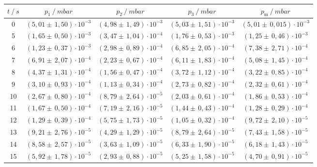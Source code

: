 \begin{table}[H]
  \centering
  \begin{tabular}{c|c|c|c|c}
    {$t \:/\: \si{s}$} & {$p_1 \:/\: \si{mbar} $} & {$p_2 \:/\: \si{mbar} $} & {$p_3 \:/\: \si{mbar} $} & {$p_{\text{m}} \:/\: \si{mbar}$}\\
  \midrule
  0    & $(5,01 \pm \, 1,50)\cdot 10^{-3}$ & $(4,98 \pm \, 1,49)\cdot 10^{-3}$ & $(5,03 \pm \, 1,51)\cdot 10^{-3}$ & $(5,01 \pm \, 0,015)\cdot 10^{-3}$\\
  5    & $(1,65 \pm \, 0,50)\cdot 10^{-3}$ & $(3,47 \pm \, 1,04)\cdot 10^{-4}$ & $(1,76 \pm \, 0,53)\cdot 10^{-3}$ & $(1,25 \pm \, 0,46)\cdot 10^{-3}$\\
  6    & $(1,23 \pm \, 0,37)\cdot 10^{-3}$ & $(2,98 \pm \, 0,89)\cdot 10^{-4}$ & $(6,85 \pm \, 2,05)\cdot 10^{-4}$ & $(7,38 \pm \, 2,71)\cdot 10^{-4}$\\  
  7    & $(6,91 \pm \, 2,07)\cdot 10^{-4}$ & $(2,23 \pm \, 0,67)\cdot 10^{-4}$ & $(6,11 \pm \, 1,83)\cdot 10^{-4}$ & $(5,08 \pm \, 1,45)\cdot 10^{-4}$\\
  8    & $(4,37 \pm \, 1,31)\cdot 10^{-4}$ & $(1,56 \pm \, 0,47)\cdot 10^{-4}$ & $(3,72 \pm \, 1,12)\cdot 10^{-4}$ & $(3,22 \pm \, 0,85)\cdot 10^{-4}$\\
  9    & $(3,10 \pm \, 0,93)\cdot 10^{-4}$ & $(1,13 \pm \, 0,34)\cdot 10^{-4}$ & $(2,73 \pm \, 0,82)\cdot 10^{-4}$ & $(2,32 \pm \, 0,61)\cdot 10^{-4}$\\
  10   & $(2,67 \pm \, 0,80)\cdot 10^{-4}$ & $(8,79 \pm \, 2,64)\cdot 10^{-5}$ & $(2,03 \pm \, 0,61)\cdot 10^{-4}$ & $(1,86 \pm \, 0,53)\cdot 10^{-4}$\\
  11   & $(1,67 \pm \, 0,50)\cdot 10^{-4}$ & $(7,19 \pm \, 2,16)\cdot 10^{-5}$ & $(1,44 \pm \, 0,43)\cdot 10^{-4}$ & $(1,28 \pm \, 0,29)\cdot 10^{-4}$\\
  12   & $(1,29 \pm \, 0,39)\cdot 10^{-4}$ & $(5,75 \pm \, 1,73)\cdot 10^{-5}$ & $(1,05 \pm \, 0,32)\cdot 10^{-4}$ & $(9,72 \pm \, 2,10)\cdot 10^{-5}$\\
  13   & $(9,21 \pm \, 2,76)\cdot 10^{-5}$ & $(4,29 \pm \, 1,29)\cdot 10^{-5}$ & $(8,79 \pm \, 2,64)\cdot 10^{-5}$ & $(7,43 \pm \, 1,58)\cdot 10^{-5}$\\
  14   & $(8,58 \pm \, 2,57)\cdot 10^{-5}$ & $(3,63 \pm \, 1,09)\cdot 10^{-5}$ & $(6,33 \pm \, 1,90)\cdot 10^{-5}$ & $(6,18 \pm \, 1,43)\cdot 10^{-5}$\\
  15   & $(5,92 \pm \, 1,78)\cdot 10^{-5}$ & $(2,93 \pm \, 0,88)\cdot 10^{-5}$ & $(5,25 \pm \, 1,58)\cdot 10^{-5}$ & $(4,70 \pm \, 0,91)\cdot 10^{-5}$\\

\end{tabular}
\end{table}
